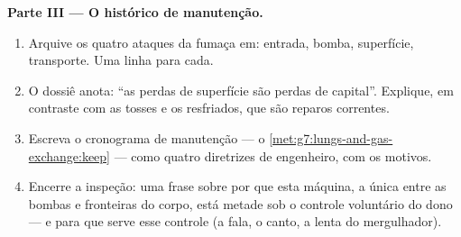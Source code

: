 \begin{problem}
\medskip\noindent\textbf{Parte III --- O histórico de
manutenção.}
\begin{enumerate}[resume]
  \item Arquive os quatro ataques da fumaça em: entrada, bomba,
        superfície, transporte. Uma linha para cada.
  \item O dossiê anota: ``as perdas de superfície são perdas de
        capital''. Explique, em contraste com as tosses e os
        resfriados, que são reparos correntes.
  \item Escreva o cronograma de manutenção --- o
        \cref{met:g7:lungs-and-gas-exchange:keep} --- como quatro
        diretrizes de engenheiro, com os motivos.
  \item Encerre a inspeção: uma frase sobre por que esta máquina, a
        única entre as bombas e fronteiras do corpo, está metade sob
        o controle voluntário do dono --- e para que serve esse
        controle (a fala, o canto, a  lenta do mergulhador).
\end{enumerate}
\end{problem}
